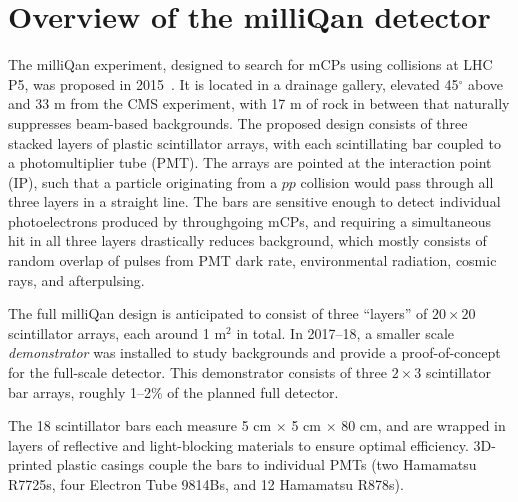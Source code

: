{\section{Overview of the milliQan detector}
The milliQan experiment, designed to search for mCPs using collisions at LHC P5, was proposed in 
2015~\cite{Haas:mcp,mq:loi}. It is located in a drainage gallery, elevated 45$^\circ$ above and 33
m from the CMS experiment, with 17 m of rock in between that naturally
suppresses beam-based backgrounds. The proposed design consists of three stacked layers of plastic 
scintillator arrays, with each scintillating bar coupled to a photomultiplier tube (PMT).
The arrays are pointed at the interaction point (IP), such that a particle originating
from a $pp$ collision would pass through all three layers in a straight line.
The bars are sensitive enough to detect individual photoelectrons produced by
throughgoing mCPs, and requiring a simultaneous hit in all three layers drastically
reduces background, which mostly consists of random overlap of pulses from
PMT dark rate, environmental radiation, cosmic rays, and afterpulsing.

The full milliQan design is anticipated to consist of three ``layers'' of $20\times20$ scintillator arrays,
each around 1 m$^2$ in total. In 2017--18, a smaller scale \textit{demonstrator} was installed
to study backgrounds and provide a proof-of-concept for the full-scale detector.
This demonstrator consists of three $2\times3$ scintillator bar arrays, roughly 1--2\%
of the planned full detector.

The 18 scintillator bars each measure 5 cm $\times$ 5 cm $\times$ 80 cm, and are
wrapped in layers of reflective and light-blocking materials to ensure optimal
efficiency. 3D-printed plastic casings couple the bars to individual PMTs
(two Hamamatsu R7725s, four Electron Tube 9814Bs, and 12 Hamamatsu R878s).

}
